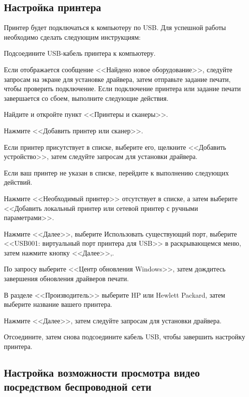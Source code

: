 \subsection{Настройка принтера}

Принтер будет подключаться к компьютеру по USB. Для успешной работы необходимо сделать следующим инструкциям:
\begin{enumerate_num}
    \item Подсоедините USB-кабель принтера к компьютеру.
    \item Если отображается сообщение <<Найдено новое оборудование>>, следуйте запросам на экране для установке драйвера, затем отправьте задание печати, чтобы проверить подключение. Если подключение принтера или задание печати завершается со сбоем, выполните следующие действия.
    \item Найдите и откройте пункт <<Принтеры и сканеры>>.
    \item Нажмите <<Добавить принтер или сканер>>.
    \item Если принтер присутствует в списке, выберите его, щелкните <<Добавить устройство>>, затем следуйте запросам для установки драйвера.
    \item Если ваш принтер не указан в списке, перейдите к выполнению следующих действий.
    \item Нажмите <<Необходимый принтер>> отсутствует в списке, а затем выберите <<Добавить локальный принтер или сетевой принтер с ручными параметрами>>.
    \item Нажмите <<Далее>>, выберите Использовать существующий порт, выберите <<USB001: виртуальный порт принтера для USB>> в раскрывающемся меню, затем нажмите кнопку <<Далее>>,.
    \item По запросу выберите <<Центр обновления Windows>>, затем дождитесь завершения обновления драйверов печати.
    \item В разделе <<Производитель>> выберите HP или Hewlett Packard, затем выберите название вашего принтера.
    \item Нажмите <<Далее>>, затем следуйте запросам для установки драйвера.
    \item Отсоедините, затем снова подсоедините кабель USB, чтобы завершить настройку принтера.
\end{enumerate_num}

\subsection{Настройка возможности просмотра видео посредством беспроводной сети}

